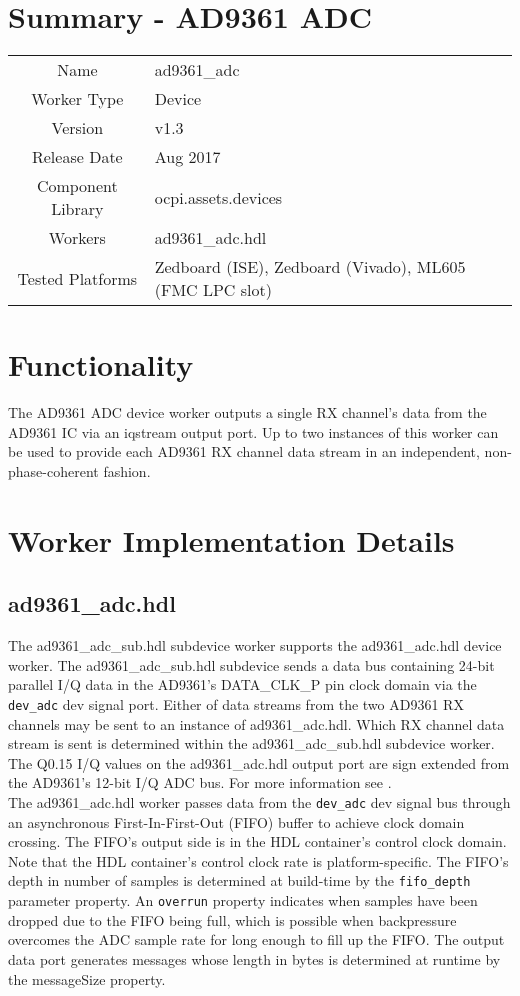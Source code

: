 \documentclass{article}
\author{} %
\date{Version \docVersion} %
\title{\docTitle}
\def\docVersion{1.3}
\def\comp{ad9361\_adc}
\def\Comp{AD9361 ADC}
\begin{document}
\section*{Summary - \Comp}
\begin{tabular}{|c|M{13.5cm}|}
	\hline
	                  &                  \\
	\hline
	Name              & \comp            \\
	\hline
	Worker Type       & Device           \\
	\hline
	Version           & v\docVersion{}   \\
	\hline
	Release Date      & Aug 2017         \\
	\hline
	Component Library & ocpi.assets.devices     \\
	\hline
	Workers           & \comp.hdl        \\
	\hline
	Tested Platforms  & Zedboard (ISE), Zedboard (Vivado), ML605 (FMC LPC slot) \\
	\hline
\end{tabular}
\section*{Functionality}
	The \Comp{} device worker outputs a single RX channel's data from the AD9361 IC\cite{ad9361} via an iqstream output port. Up to two instances of this worker can be used to provide each AD9361 RX channel data stream in an independent, non-phase-coherent fashion.
\section*{Worker Implementation Details}
\subsection*{\comp.hdl}
The ad9361\_adc\_sub.hdl subdevice worker supports the \comp{}.hdl device worker. The ad9361\_adc\_sub.hdl subdevice sends a data bus containing 24-bit parallel I/Q data in the AD9361's DATA\_CLK\_P pin clock domain via the \verb+dev_adc+ dev signal port. Either of data streams from the two AD9361 RX channels  may be sent to an instance of \comp{}.hdl. Which RX channel data stream is sent is determined within the ad9361\_adc\_sub.hdl subdevice worker. The Q0.15 I/Q values on the \comp{}.hdl output port are sign extended from the AD9361's 12-bit I/Q ADC bus. For more information see \cite{adc_sub_comp_datasheet}. \\
The \comp{}.hdl worker passes data from the \verb+dev_adc+ dev signal bus  through an asynchronous First-In-First-Out (FIFO) buffer to achieve clock domain crossing. The FIFO's output side is in the HDL container's control clock domain. Note that the HDL container's control clock rate is platform-specific. The FIFO's depth in number of samples is determined at build-time by the \verb+fifo_depth+ parameter property. An \verb+overrun+ property indicates when samples have been dropped due to the FIFO being full, which is possible when backpressure overcomes the ADC sample rate for long enough to fill up the FIFO. The output data port generates messages whose length in bytes is determined at runtime by the messageSize property.
\end{document}
